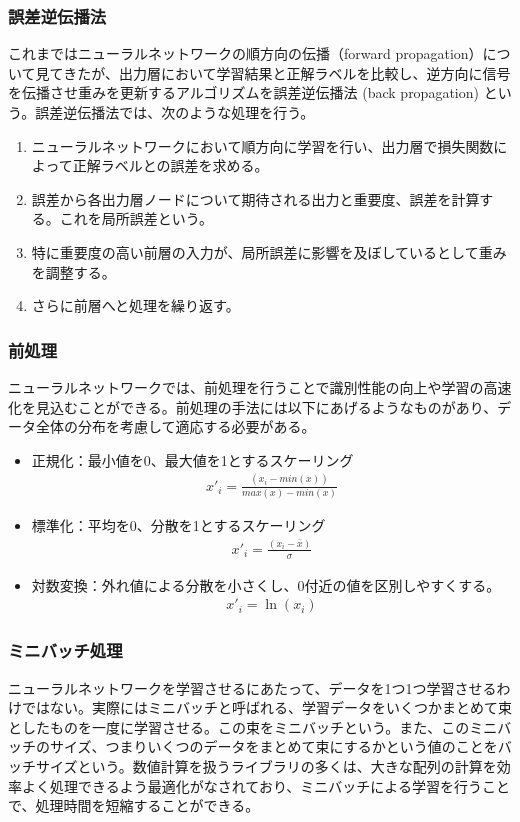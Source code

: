 \subsubsection{誤差逆伝播法}
これまではニューラルネットワークの順方向の伝播（forward propagation）について見てきたが、出力層において学習結果と正解ラベルを比較し、逆方向に信号を伝播させ重みを更新するアルゴリズムを誤差逆伝播法 (back propagation) という。誤差逆伝播法では、次のような処理を行う。
\begin{enumerate}
	\item ニューラルネットワークにおいて順方向に学習を行い、出力層で損失関数によって正解ラベルとの誤差を求める。
	\item 誤差から各出力層ノードについて期待される出力と重要度、誤差を計算する。これを局所誤差という。
	\item 特に重要度の高い前層の入力が、局所誤差に影響を及ぼしているとして重みを調整する。
	\item さらに前層へと処理を繰り返す。
\end{enumerate}
\subsubsection{前処理}
ニューラルネットワークでは、前処理を行うことで識別性能の向上や学習の高速化を見込むことができる。前処理の手法には以下にあげるようなものがあり、データ全体の分布を考慮して適応する必要がある。
\begin{itemize}
 \item 正規化：最小値を0、最大値を1とするスケーリング
 \begin{align}x'_i = \frac{(x_i - min(x))}{max(x)-min(x)}\end{align}
 \item 標準化：平均を0、分散を1とするスケーリング
 \begin{align}x'_i = \frac{(x_i - \bar{x})}{\sigma}\end{align}
 \item 対数変換：外れ値による分散を小さくし、0付近の値を区別しやすくする。
 \begin{align}x'_i = \ln(x_i)\end{align}
\end{itemize}
\subsubsection{ミニバッチ処理}
ニューラルネットワークを学習させるにあたって、データを1つ1つ学習させるわけではない。実際にはミニバッチと呼ばれる、学習データをいくつかまとめて束としたものを一度に学習させる。この束をミニバッチという。また、このミニバッチのサイズ、つまりいくつのデータをまとめて束にするかという値のことをバッチサイズという。数値計算を扱うライブラリの多くは、大きな配列の計算を効率よく処理できるよう最適化がなされており、ミニバッチによる学習を行うことで、処理時間を短縮することができる。
